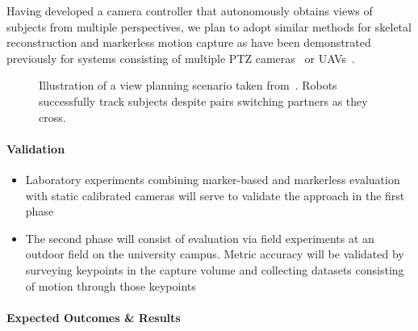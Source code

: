 \documentclass[12pt]{article}
\begin{document}
Having developed a camera controller that autonomously obtains views of subjects
from multiple perspectives, we plan to adopt similar methods for skeletal
reconstruction and markerless motion capture as have been demonstrated
previously for systems consisting of multiple PTZ
cameras~\citep{bachmann20193dv} or
UAVs~\citep{saini2019iccv,ho2021iros,hong2024eccv,saini2022ral}.

\begin{figure}
\centering
\setlength{\tabcolsep}{1pt}
\setlength{\figureheight}{1.2in}
      \resizebox{\linewidth}{!}{
      
      }
      \caption{%
        Illustration of a view planning scenario taken
        from~\citep{hughes2024cdc}.
        Robots successfully track subjects despite pairs switching partners as
        they cross.
      }%
      \label{fig:qualitative}
\end{figure}

\paragraph{Validation}
\begin{itemize}
  \item Laboratory experiments combining marker-based and markerless evaluation
    with static calibrated cameras will serve to validate the approach in the
    first phase
  \item The second phase will consist of evaluation via field experiments at an
    outdoor field on the university campus.
    Metric accuracy will be validated by surveying keypoints in the capture
    volume and collecting datasets consisting of motion through those keypoints
\end{itemize}

\paragraph{Expected Outcomes \& Results}
\end{document}
